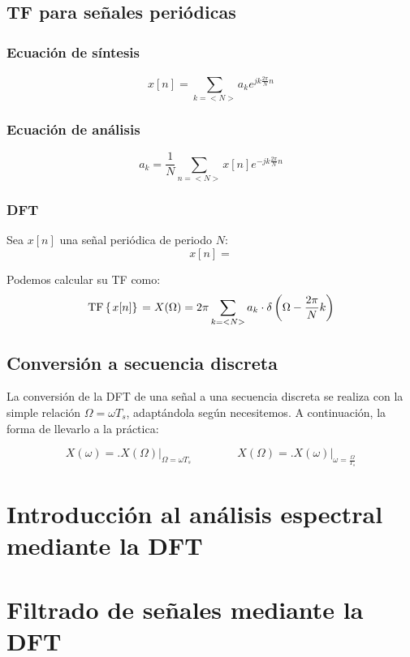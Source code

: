 \documentclass[a4paper]{book}
\begin{document}
\subsection{TF para señales periódicas}

\begin{multicols}{2}
	\subsubsection{Ecuación de síntesis}
	
	\[ x[n] = \sum_{k=<N>}^{}a_ke^{jk \frac{2\pi}{N} n}\]
	
	\subsubsection{Ecuación de análisis}
	
	\[ a_k = \frac{1}{N}\sum_{n=<N>}x[n]e^{-jk \frac{2\pi}{N}n} \]
	
\end{multicols}

\subsubsection{DFT}

Sea $x[n]$ una señal periódica de periodo $N$: \[ x[n] = \]

Podemos calcular su TF como:
\[ \mathrm{TF} \left\lbrace \left. x[n] \right\rbrace \right. = X(\Omega ) = 2\pi \sum_{k=<N>}a_k \cdot \delta \left( \Omega - \frac{2\pi}{N}k \right)\]

\subsection{Conversión a secuencia discreta}

La conversión de la DFT de una señal a una secuencia discreta se realiza con la simple relación $\Omega = \omega T_s$, adaptándola según necesitemos. A continuación, la forma de llevarlo a la práctica:

\[ X \left( \omega \right) = \biggl. X \left( \Omega \right)  \biggr\vert _{\Omega = \omega T_s} \qquad \qquad X \left( \Omega \right) = \biggl. X \left( \omega \right)  \biggr\vert _{\omega = \frac{\Omega}{T_s}} \]

\section{Introducción al análisis espectral mediante la DFT}

\section{Filtrado de señales mediante la DFT}
\end{document}
